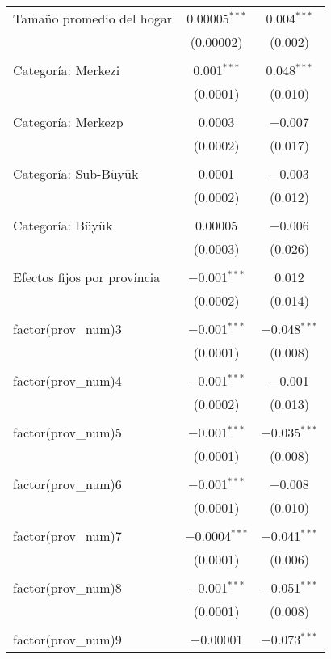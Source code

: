 \begin{table}[ht!]
\begin{tabular}{@{\extracolsep{5pt}}lcc}
 Tamaño promedio del hogar & 0.00005$^{***}$ & 0.004$^{***}$ \\ 
  & (0.00002) & (0.002) \\ 
  & & \\ 
 Categoría: Merkezi & 0.001$^{***}$ & 0.048$^{***}$ \\ 
  & (0.0001) & (0.010) \\ 
  & & \\ 
 Categoría: Merkezp & 0.0003 & $-$0.007 \\ 
  & (0.0002) & (0.017) \\ 
  & & \\ 
 Categoría: Sub-Büyük & 0.0001 & $-$0.003 \\ 
  & (0.0002) & (0.012) \\ 
  & & \\ 
 Categoría: Büyük & 0.00005 & $-$0.006 \\ 
  & (0.0003) & (0.026) \\ 
  & & \\ 
 Efectos fijos por provincia & $-$0.001$^{***}$ & 0.012 \\ 
  & (0.0002) & (0.014) \\ 
  & & \\ 
 factor(prov\_num)3 & $-$0.001$^{***}$ & $-$0.048$^{***}$ \\ 
  & (0.0001) & (0.008) \\ 
  & & \\ 
 factor(prov\_num)4 & $-$0.001$^{***}$ & $-$0.001 \\ 
  & (0.0002) & (0.013) \\ 
  & & \\ 
 factor(prov\_num)5 & $-$0.001$^{***}$ & $-$0.035$^{***}$ \\ 
  & (0.0001) & (0.008) \\ 
  & & \\ 
 factor(prov\_num)6 & $-$0.001$^{***}$ & $-$0.008 \\ 
  & (0.0001) & (0.010) \\ 
  & & \\ 
 factor(prov\_num)7 & $-$0.0004$^{***}$ & $-$0.041$^{***}$ \\ 
  & (0.0001) & (0.006) \\ 
  & & \\ 
 factor(prov\_num)8 & $-$0.001$^{***}$ & $-$0.051$^{***}$ \\ 
  & (0.0001) & (0.008) \\ 
  & & \\ 
 factor(prov\_num)9 & $-$0.00001 & $-$0.073$^{***}$ \\ 

\end{tabular}
\end{table}
